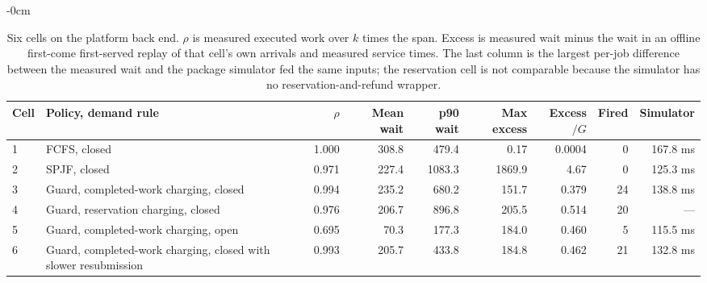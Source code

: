 \documentclass[mathematics,supfile,submit,moreauthors]{Definitions/mdpi}
\newcommand{\devnum}[1]{#1}
\begin{document}
\begin{table}[htbp]
\centering
\small
\caption{Six cells on the platform back end. $\rho$ is measured executed work over $k$
times the span. Excess is measured wait minus the wait in an offline first-come
first-served replay of that cell's own arrivals and measured service times. The last
column is the largest per-job difference between the measured wait and the package
simulator fed the same inputs; the reservation cell is not comparable because the
simulator has no reservation-and-refund wrapper.}
\label{tab:s_platform}
\setlength{\tabcolsep}{3pt}
\begin{adjustwidth}{-\extralength}{0cm}
\centering
\begin{tabular}{l>{\raggedright\arraybackslash}p{0.27\fulllength}rrrrrrr}
\toprule
Cell & Policy, demand rule & $\rho$ & Mean wait & p90 wait & Max excess & Excess$/G$ & Fired & Simulator \\
\midrule
1 & FCFS, closed & \devnum{1.000} & \devnum{308.8} & \devnum{479.4} & \devnum{0.17} & \devnum{0.0004} & \devnum{0} & \devnum{167.8} ms \\
2 & SPJF, closed & \devnum{0.971} & \devnum{227.4} & \devnum{1083.3} & \devnum{1869.9} & \devnum{4.67} & \devnum{0} & \devnum{125.3} ms \\
3 & Guard, completed-work charging, closed & \devnum{0.994} & \devnum{235.2} & \devnum{680.2} & \devnum{151.7} & \devnum{0.379} & \devnum{24} & \devnum{138.8} ms \\
4 & Guard, reservation charging, closed & \devnum{0.976} & \devnum{206.7} & \devnum{896.8} & \devnum{205.5} & \devnum{0.514} & \devnum{20} & --- \\
5 & Guard, completed-work charging, open & \devnum{0.695} & \devnum{70.3} & \devnum{177.3} & \devnum{184.0} & \devnum{0.460} & \devnum{5} & \devnum{115.5} ms \\
6 & Guard, completed-work charging, closed with slower resubmission & \devnum{0.993} & \devnum{205.7} & \devnum{433.8} & \devnum{184.8} & \devnum{0.462} & \devnum{21} & \devnum{132.8} ms \\
\bottomrule
\end{tabular}
\end{adjustwidth}
\end{table}
\end{document}
